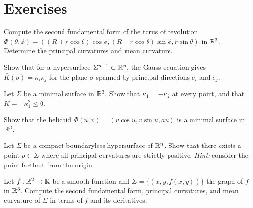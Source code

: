 \section{Exercises}

\begin{exercise}
Compute the second fundamental form of the torus of revolution
$\Phi(\theta, \phi) = ((R + r\cos\theta)\cos\phi,
(R + r\cos\theta)\sin\phi, r\sin\theta)$ in $\mathbb{R}^3$. Determine the principal
curvatures and mean curvature.
\end{exercise}

\begin{exercise}
Show that for a hypersurface $\Sigma^{n-1} \subset \mathbb{R}^n$, the Gauss equation gives
$\bar{K}(\sigma) = \kappa_i \kappa_j$ for the plane $\sigma$ spanned by principal
directions $e_i$ and $e_j$.
\end{exercise}

\begin{exercise}
Let $\Sigma$ be a minimal surface in $\mathbb{R}^3$. Show that $\kappa_1 = -\kappa_2$ at
every point, and that $K = -\kappa_1^2 \leq 0$.
\end{exercise}

\begin{exercise}
Show that the helicoid $\Phi(u,v) = (v\cos u, v\sin u, au)$ is a minimal surface
in $\mathbb{R}^3$.
\end{exercise}

\begin{exercise}
Let $\Sigma$ be a compact boundaryless hypersurface of $\mathbb{R}^n$. Show that there
exists a point $p \in \Sigma$ where all principal curvatures are strictly positive.
\emph{Hint:} consider the point farthest from the origin.
\end{exercise}

\begin{exercise}
Let $f : \mathbb{R}^2 \to \mathbb{R}$ be a smooth function and $\Sigma = \{(x, y, f(x,y))\}$ the
graph of $f$ in $\mathbb{R}^3$. Compute the second fundamental form, principal curvatures,
and mean curvature of $\Sigma$ in terms of $f$ and its derivatives.
\end{exercise}
